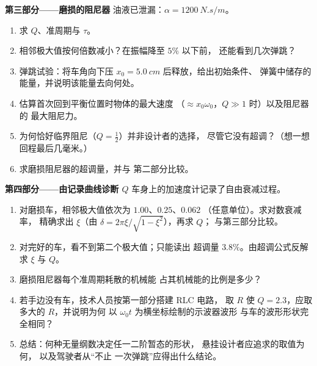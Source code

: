 \begin{problem}
\medskip
\noindent\textbf{第三部分——磨损的阻尼器}
油液已泄漏：$\alpha = \qty{1200}{N.s/m}$。
\begin{enumerate}[resume]
  \item 求 $Q$、准周期与 $\tau$。
  \item 相邻极大值按何倍数减小？在振幅降至 $5\%$ 以下前，
        还能看到几次弹跳？
  \item 弹跳试验：将车角向下压 $x_0 =
        \qty{5.0}{cm}$ 后释放，给出初始条件、
        弹簧中储存的能量，并说明该能量去向何处。
  \item 估算首次回到平衡位置时物体的最大速度
        （$\approx x_0\omega_0$，$Q \gg 1$ 时）以及阻尼器的
        最大阻尼力。
  \item 为何恰好临界阻尼（$Q = \tfrac12$）并非设计者的选择，
        尽管它没有超调？（想一想
        回程最后几毫米。）
  \item 求磨损阻尼器的超调量，并与
        第二部分比较。
\end{enumerate}

\medskip
\noindent\textbf{第四部分——由记录曲线诊断 $Q$}
车身上的加速度计记录了自由衰减过程。
\begin{enumerate}[resume]
  \item 对磨损车，相邻极大值依次为 $1.00$、$0.25$、$0.062$
        （任意单位）。求对数衰减率，
        精确求出 $\xi$（由 $\delta = 2\pi\xi/\sqrt{1 - \xi^2}$），再求 $Q$；
        与第三部分比较。
  \item 对完好的车，看不到第二个极大值；只能读出
        超调量 $3.8\%$。由超调公式反解
        求 $\xi$ 与 $Q$。
  \item 磨损阻尼器每个准周期耗散的机械能
        占其机械能的比例是多少？
  \item 若手边没有车，技术人员按第一部分搭建 RLC 电路，
        取 $R$ 使 $Q = 2.3$，应取多大的 $R$，并说明为何
        以 $\omega_0 t$ 为横坐标绘制的示波器波形
        与车的波形形状完全相同？
  \item 总结：何种无量纲数决定任一二阶暂态的形状，
        悬挂设计者应追求的取值为何，
        以及驾驶者从“不止
        一次弹跳”应得出什么结论。
\end{enumerate}
\end{problem}

